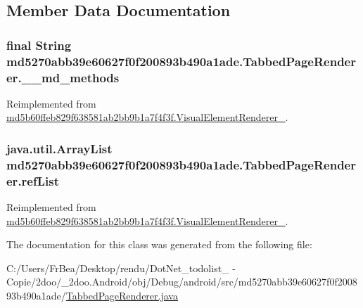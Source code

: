 \subsection{Member Data Documentation}
\hypertarget{classmd5270abb39e60627f0f200893b490a1ade_1_1_tabbed_page_renderer_61bf05aab3c9447ee5d368ab4be86a41}{
\subsubsection[{\_\-\_\-md\_\-methods}]{\setlength{\rightskip}{0pt plus 5cm}final String {\bf md5270abb39e60627f0f200893b490a1ade.TabbedPageRenderer.\_\-\_\-md\_\-methods}}}
\label{classmd5270abb39e60627f0f200893b490a1ade_1_1_tabbed_page_renderer_61bf05aab3c9447ee5d368ab4be86a41}




Reimplemented from \hyperlink{classmd5b60ffeb829f638581ab2bb9b1a7f4f3f_1_1_visual_element_renderer__1_4ef182bc984a4330ed789e1f0b0222d1}{md5b60ffeb829f638581ab2bb9b1a7f4f3f.VisualElementRenderer\_}.\hypertarget{classmd5270abb39e60627f0f200893b490a1ade_1_1_tabbed_page_renderer_68463cfbc83b39600752261e37af0f3d}{
\subsubsection[{refList}]{\setlength{\rightskip}{0pt plus 5cm}java.util.ArrayList {\bf md5270abb39e60627f0f200893b490a1ade.TabbedPageRenderer.refList}}}
\label{classmd5270abb39e60627f0f200893b490a1ade_1_1_tabbed_page_renderer_68463cfbc83b39600752261e37af0f3d}




Reimplemented from \hyperlink{classmd5b60ffeb829f638581ab2bb9b1a7f4f3f_1_1_visual_element_renderer__1_4ebd0e42ebd360712eb189930036fc9f}{md5b60ffeb829f638581ab2bb9b1a7f4f3f.VisualElementRenderer\_}.

The documentation for this class was generated from the following file:\begin{CompactItemize}
\item 
C:/Users/FrBea/Desktop/rendu/DotNet\_\-todolist\_ - Copie/2doo/\_\-2doo.Android/obj/Debug/android/src/md5270abb39e60627f0f200893b490a1ade/\hyperlink{_tabbed_page_renderer_8java}{TabbedPageRenderer.java}\end{CompactItemize}
